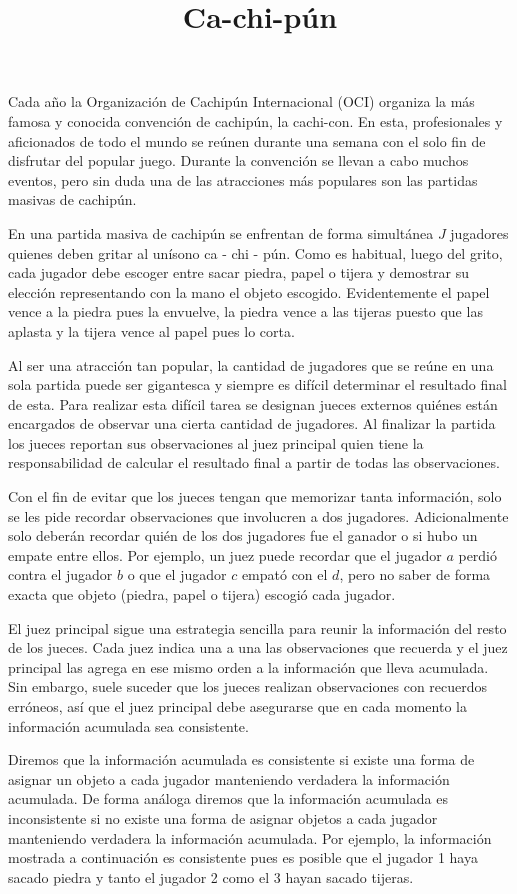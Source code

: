 \documentclass{oci}
\title{Ca-chi-pún}
\begin{document}
\begin{problemDescription}
  Cada año la Organización de Cachipún Internacional (OCI) organiza la
  más famosa y conocida convención de cachipún, la cachi-con.
  En esta, profesionales y aficionados de todo el mundo se reúnen durante una
  semana con el solo fin de disfrutar del popular juego.
  Durante la convención se llevan a cabo muchos eventos, pero sin duda una de
  las atracciones más populares son las partidas masivas de cachipún.

  En una partida masiva de cachipún se enfrentan de forma simultánea $J$
  jugadores quienes deben gritar al unísono ca - chi - pún.
  Como es habitual, luego del grito, cada jugador debe escoger entre sacar
  piedra, papel o tijera y demostrar su elección representando con la mano
  el objeto escogido.
  Evidentemente el papel vence a la piedra pues la envuelve, la piedra vence a
  las tijeras puesto que las aplasta y la tijera vence al papel pues lo corta.

  Al ser una atracción tan popular, la cantidad de jugadores que se reúne en una
  sola partida puede ser gigantesca y siempre es difícil determinar el
  resultado final de esta.
  Para realizar esta difícil tarea se designan jueces externos quiénes
  están encargados de observar una cierta cantidad de jugadores.
  Al finalizar la partida los jueces reportan sus observaciones al juez
  principal quien tiene la responsabilidad de calcular el resultado final a
  partir de todas las observaciones.

  Con el fin de evitar que los jueces tengan que memorizar tanta información,
  solo se les pide recordar observaciones que involucren a dos jugadores.
  Adicionalmente solo deberán recordar quién de los dos jugadores fue el ganador
  o si hubo un empate entre ellos.
  Por ejemplo, un juez puede recordar que el jugador $a$ perdió contra el
  jugador $b$ o que el jugador $c$ empató con el $d$, pero no saber de forma
  exacta que objeto (piedra, papel o tijera) escogió cada jugador.

  El juez principal sigue una estrategia sencilla para reunir la información del
  resto de los jueces.
  Cada juez indica una a una las observaciones que recuerda y el juez principal
  las agrega en ese mismo orden a la información que lleva acumulada.
  Sin embargo, suele suceder que los jueces realizan observaciones con recuerdos
  erróneos, así que el juez principal debe asegurarse que en cada momento la
  información acumulada sea consistente.

  Diremos que la información acumulada es consistente si existe una forma de
  asignar un objeto a cada jugador manteniendo verdadera la información
  acumulada.
  De forma análoga diremos que la información acumulada es inconsistente si no
  existe una forma de asignar objetos a cada jugador manteniendo verdadera la
  información acumulada.
  Por ejemplo, la información mostrada a continuación es consistente pues es
  posible que el jugador 1 haya sacado piedra y tanto el jugador 2 como
  el 3 hayan sacado tijeras.


\end{problemDescription}
\end{document}
